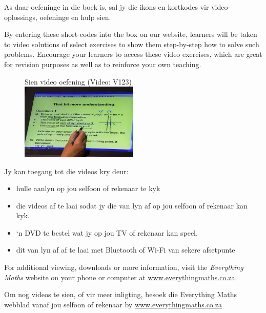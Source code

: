 {\Large
As daar oefeninge in die boek is, sal jy die ikons en kortkodes vir video-oplossings, oefeninge en hulp sien. 

 By entering these short-codes into the box on our website, learners will be taken to video solutions of select exercises to show them
step-by-step how to solve such problems. Encourage your learners to access these video exercises, which are great for revision purposes as well as to reinforce your own teaching.\par

\begin{figure}[h]
\begin{center}
Sien video oefening  (Video: V123)\\ 
\includegraphics[width=0.5\textwidth]{../title_images/mindsetexercise.png}
\end{center}
\end{figure}

Jy kan toegang tot die videos kry deur:
\begin{itemize}[noitemsep]
\item hulle aanlyn op jou selfoon of rekenaar te kyk
\item die videos af te laai sodat jy die van lyn af op jou selfoon of rekenaar kan kyk.
\item ‘n DVD te bestel wat jy op jou TV of rekenaar kan speel.
\item dit van lyn af af te laai met Bluetooth of Wi-Fi van sekere afsetpunte
\end{itemize}
For additional viewing, downloads or more information, visit the \textit{Everything Maths} website on your phone or computer at \underline{www.everythingmaths.co.za}.


Om nog videos te sien, of vir meer inligting, besoek die Everything Maths webblad vanaf jou selfoon of rekenaar by \underline{www.everythingmaths.co.za}    \par
\vspace*{1cm}
}


